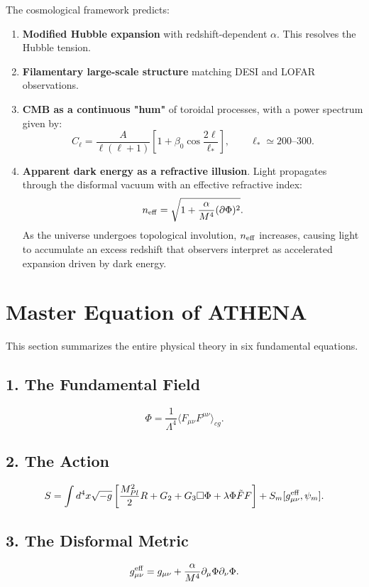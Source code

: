 \documentclass[12pt,oneside]{book}
\begin{document}
The cosmological framework predicts:
\begin{enumerate}
    \item \textbf{Modified Hubble expansion} with redshift-dependent $\alpha$. This resolves the Hubble tension.
    \item \textbf{Filamentary large-scale structure} matching DESI and LOFAR observations.
    \item \textbf{CMB as a continuous "hum"} of toroidal processes, with a power spectrum given by:
    \[
    C_\ell = \frac{A}{\ell(\ell+1)} \left[1 + \beta_0 \cos\frac{2\ell}{\ell_*}\right], \qquad \ell_* \simeq 200\text{--}300.
    \]
    \item \textbf{Apparent dark energy as a refractive illusion}. Light propagates through the disformal vacuum with an effective refractive index:
    \[
    n_{\rm eff} = \sqrt{1 + \frac{\alpha}{M^4}(\partial\Phi)^2}.
    \]
    As the universe undergoes topological involution, $n_{\rm eff}$ increases, causing light to accumulate an excess redshift that observers interpret as accelerated expansion driven by dark energy.
\end{enumerate}

\section{Master Equation of ATHENA}

This section summarizes the entire physical theory in six fundamental equations.

\subsection{1. The Fundamental Field}
\[
\Phi = \frac{1}{\Lambda^4} \langle F_{\mu\nu} F^{\mu\nu} \rangle_{cg}.
\]

\subsection{2. The Action}
\[
S = \int d^4x \sqrt{-g} \left[ \frac{M_{Pl}^2}{2} R + G_2 + G_3 \square\Phi + \lambda \Phi \tilde{F}F \right] + S_m[g_{\mu\nu}^{\rm eff}, \psi_m].
\]

\subsection{3. The Disformal Metric}
\[
g_{\mu\nu}^{\rm eff} = g_{\mu\nu} + \frac{\alpha}{M^4} \partial_\mu\Phi \partial_\nu\Phi.
\]
\end{document}
